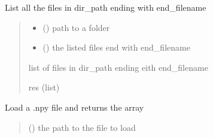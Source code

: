 \documentclass[letterpaper,10pt,english]{sphinxmanual}
\begin{document}
\begin{fulllineitems}
\begin{fulllineitems}
\begin{quote}
\begin{description}
\end{description}\end{quote}

\end{fulllineitems}


\begin{fulllineitems}
\label{\detokenize{index:raypyng.postprocessing.PostProcess._list_files}}
\pysigstartsignatures
{}
\pysigstopsignatures
\sphinxAtStartPar
List all the files in dir\_path ending with end\_filename
\begin{quote}\begin{description}
\begin{itemize}
\item {} 
\sphinxAtStartPar
{} () \textendash{} path to a folder

\item {} 
\sphinxAtStartPar
{} () \textendash{} the listed files end with end\_filename

\end{itemize}

\sphinxAtStartPar
list of files in dir\_path ending eith end\_filename

\sphinxAtStartPar
res (list)

\end{description}\end{quote}

\end{fulllineitems}


\begin{fulllineitems}
\label{\detokenize{index:raypyng.postprocessing.PostProcess._load_file}}
\pysigstartsignatures
{}
\pysigstopsignatures
\sphinxAtStartPar
Load a .npy file and returns the array
\begin{quote}\begin{description}
\sphinxAtStartPar
{} () \textendash{} the path to the file to load


\end{description}
\end{quote}
\end{fulllineitems}
\end{fulllineitems}
\end{document}
